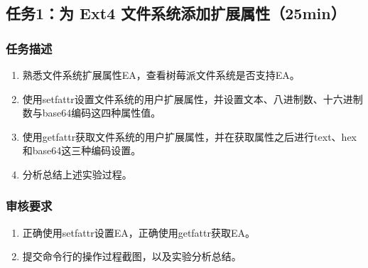 \documentclass{article}
\begin{document}
\subsection{任务1：为 Ext4 文件系统添加扩展属性（25min）}

\subsubsection{任务描述}
\begin{enumerate}
	\item 熟悉文件系统扩展属性EA，查看树莓派文件系统是否支持EA。
	\item 使用setfattr设置文件系统的用户扩展属性，并设置文本、八进制数、十六进制数与base64编码这四种属性值。
	\item 使用getfattr获取文件系统的用户扩展属性，并在获取属性之后进行text、hex和base64这三种编码设置。
	\item 分析总结上述实验过程。
\end{enumerate}

\subsubsection{审核要求}
\begin{enumerate}
	\item 正确使用setfattr设置EA，正确使用getfattr获取EA。
	\item 提交命令行的操作过程截图，以及实验分析总结。
\end{enumerate}
\end{document}
